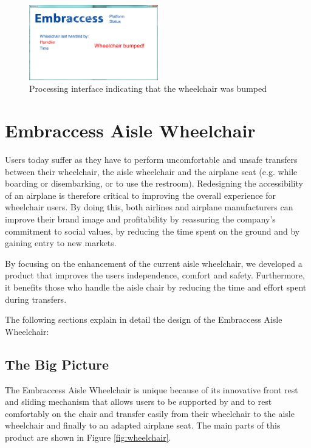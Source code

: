 \begin{figure}
\centering
 \includegraphics[width=0.5\textwidth]{images/processing_bump}
\caption{Processing interface indicating that the wheelchair was bumped}
\label{fig:processing_bump}
\end{figure}


\section{Embraccess Aisle Wheelchair}

Users today suffer as they have to perform uncomfortable and unsafe transfers between their wheelchair, the aisle wheelchair and the airplane seat (e.g. while boarding or disembarking, or to use the restroom). Redesigning the accessibility of an airplane is therefore critical to improving the overall experience for wheelchair users. By doing this, both airlines and airplane manufacturers can improve their brand image and profitability by reassuring the company's commitment to social values, by reducing the time spent on the ground and by gaining entry to new markets.

By focusing on the enhancement of the current aisle wheelchair, we developed a product that improves the users independence, comfort and safety. Furthermore, it benefits those who handle the aisle chair by reducing the time and effort spent during transfers.

The following sections explain in detail the design of the Embraccess Aisle Wheelchair:

\subsection{The Big Picture}

The Embraccess Aisle Wheelchair is unique because of its innovative front rest and sliding mechanism that allows users to be supported by and to rest comfortably on the chair and transfer easily from their wheelchair to the aisle wheelchair and finally to an adapted airplane seat. The main parts of this product are shown in Figure \ref{fig:wheelchair}. 

